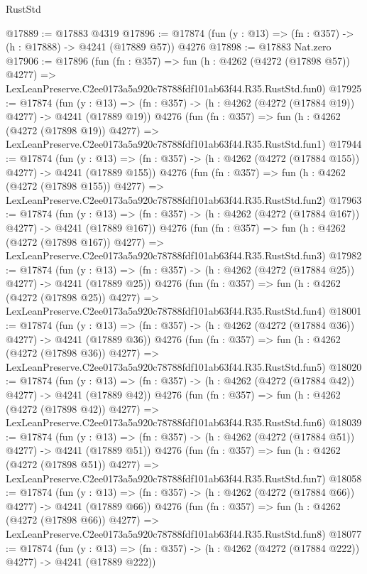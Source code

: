 \begin{lexlean}{RustStd}
\begin{coremodule}
@17889 := @17883 @4319
@17896 := @17874 (fun (y : @13) => (fn : @357) -> (h : @17888) -> @4241 (@17889 @57)) @4276
@17898 := @17883 Nat.zero
@17906 := @17896
    (fun (fn : @357) =>
    fun (h : @4262 (@4272 (@17898 @57)) @4277) =>
    LexLeanPreserve.C2ee0173a5a920c78788fdf101ab63f44.R35.RustStd.fun0)
@17925 := @17874
    (fun (y : @13) => (fn : @357) -> (h : @4262 (@4272 (@17884 @19)) @4277) -> @4241 (@17889 @19))
    @4276
    (fun (fn : @357) =>
    fun (h : @4262 (@4272 (@17898 @19)) @4277) =>
    LexLeanPreserve.C2ee0173a5a920c78788fdf101ab63f44.R35.RustStd.fun1)
@17944 := @17874
    (fun (y : @13) => (fn : @357) -> (h : @4262 (@4272 (@17884 @155)) @4277) -> @4241 (@17889 @155))
    @4276
    (fun (fn : @357) =>
    fun (h : @4262 (@4272 (@17898 @155)) @4277) =>
    LexLeanPreserve.C2ee0173a5a920c78788fdf101ab63f44.R35.RustStd.fun2)
@17963 := @17874
    (fun (y : @13) => (fn : @357) -> (h : @4262 (@4272 (@17884 @167)) @4277) -> @4241 (@17889 @167))
    @4276
    (fun (fn : @357) =>
    fun (h : @4262 (@4272 (@17898 @167)) @4277) =>
    LexLeanPreserve.C2ee0173a5a920c78788fdf101ab63f44.R35.RustStd.fun3)
@17982 := @17874
    (fun (y : @13) => (fn : @357) -> (h : @4262 (@4272 (@17884 @25)) @4277) -> @4241 (@17889 @25))
    @4276
    (fun (fn : @357) =>
    fun (h : @4262 (@4272 (@17898 @25)) @4277) =>
    LexLeanPreserve.C2ee0173a5a920c78788fdf101ab63f44.R35.RustStd.fun4)
@18001 := @17874
    (fun (y : @13) => (fn : @357) -> (h : @4262 (@4272 (@17884 @36)) @4277) -> @4241 (@17889 @36))
    @4276
    (fun (fn : @357) =>
    fun (h : @4262 (@4272 (@17898 @36)) @4277) =>
    LexLeanPreserve.C2ee0173a5a920c78788fdf101ab63f44.R35.RustStd.fun5)
@18020 := @17874
    (fun (y : @13) => (fn : @357) -> (h : @4262 (@4272 (@17884 @42)) @4277) -> @4241 (@17889 @42))
    @4276
    (fun (fn : @357) =>
    fun (h : @4262 (@4272 (@17898 @42)) @4277) =>
    LexLeanPreserve.C2ee0173a5a920c78788fdf101ab63f44.R35.RustStd.fun6)
@18039 := @17874
    (fun (y : @13) => (fn : @357) -> (h : @4262 (@4272 (@17884 @51)) @4277) -> @4241 (@17889 @51))
    @4276
    (fun (fn : @357) =>
    fun (h : @4262 (@4272 (@17898 @51)) @4277) =>
    LexLeanPreserve.C2ee0173a5a920c78788fdf101ab63f44.R35.RustStd.fun7)
@18058 := @17874
    (fun (y : @13) => (fn : @357) -> (h : @4262 (@4272 (@17884 @66)) @4277) -> @4241 (@17889 @66))
    @4276
    (fun (fn : @357) =>
    fun (h : @4262 (@4272 (@17898 @66)) @4277) =>
    LexLeanPreserve.C2ee0173a5a920c78788fdf101ab63f44.R35.RustStd.fun8)
@18077 := @17874
    (fun (y : @13) => (fn : @357) -> (h : @4262 (@4272 (@17884 @222)) @4277) -> @4241 (@17889 @222))

\end{coremodule}
\end{lexlean}
